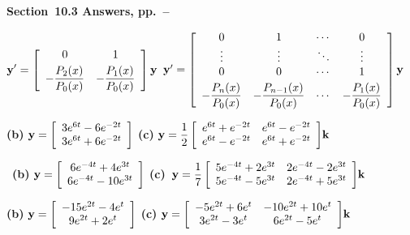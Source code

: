 {\bf Section~10.3 Answers,
pp.~\pageref{exer:10.3.1}--\pageref{exer:10.3.18}}\medskip

$\displaystyle{{\bf
y}'=\left[\begin{array}{cc}0&1\\[\jot]-\displaystyle\frac{P_{2}(x)}{P_{0}(x)}&-\displaystyle\frac{P_{1}(x)}{P_{0}(x)}\end{array}\right]{\bf y}}$
\quad
{}
${\bf y}'=\left[\begin{array}{cccc}
0&1&\cdots&0\\\vdots&\vdots&\ddots&\vdots\\0&0&\cdots&1\\[\jot]
-\displaystyle\frac{P_{n}(x)}{P_{0}(x)}&-\displaystyle\frac{P_{n-1}(x)}{P_{0}(x)}&\cdots&
-\displaystyle\frac{P_{1}(x)}{P_{0}(x)}\end{array}\right]{\bf y}$

\smallskip

{\bf (b)}\;
${\bf y}=\displaystyle{\left[\begin{array}{c}3e^{6t}-6e^{-2t}\\3e^{6t}+6e^{-2t}
\end{array}\right]}$ \quad
{\bf (c)}\;
${\bf y}=
\displaystyle{\frac{1}{2}\left[\begin{array}{cc}e^{6t}+e^{-2t}&e^{6t}-e^{-2t}
\\e^{6t}-e^{-2t}&e^{6t}+e^{-2t}\end{array}\right]}{\bf k}$

\bigskip

\,
{\bf (b)}
${\bf
y}=\displaystyle{\left[\begin{array}{c}6e^{-4t}+4e^{3t}\\6e^{-4t}-10e^{3t}
\end{array}\right]}$\quad\;
{\bf
(c)}\, ${\bf y}=
\displaystyle{\frac{1}{7}\left[\begin{array}{cc}5e^{-4t}+2e^{3t}&2e^{-4t}-2e^{3t}
\\5e^{-4t}-5e^{3t}&2e^{-4t}+5e^{3t}\end{array}\right]}{\bf k}$
\medskip

{\bf (b)}
${\bf y}=\displaystyle{\left[\begin{array}{c}-15e^{2t}-4e^{t}\\9e^{2t}+2e^{t}
\end{array}\right]}$
{\bf
\qquad (c)} ${\bf
y}=\displaystyle{\left[\begin{array}{cc}-5e^{2t}+6e^{t}&-10e^{2t}+10e^{t}
\\3e^{2t}-3e^{t}&6e^{2t}-5e^{t}\end{array}\right]}{\bf k}$

